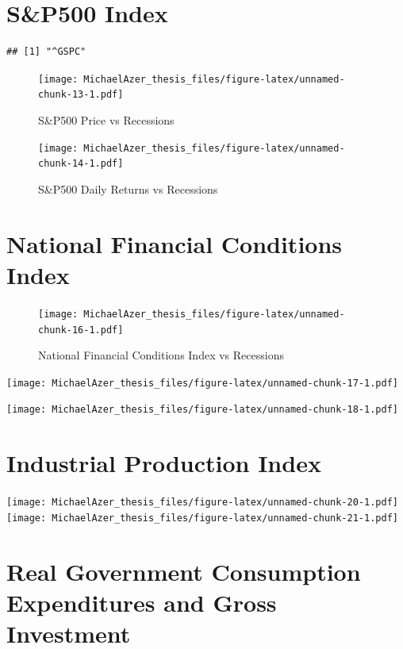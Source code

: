 \documentclass[]{book}
\begin{document}
\hypertarget{sp500-index}{%
\section{S\&P500 Index}\label{sp500-index}}

\begin{verbatim}
## [1] "^GSPC"
\end{verbatim}

\begin{figure}
\centering
\texttt{[image: MichaelAzer\_thesis\_files/figure-latex/unnamed-chunk-13-1.pdf]}
\caption{\label{fig:unnamed-chunk-13}\label{fig:figs}S\&P500 Price vs Recessions}
\end{figure}

\begin{figure}
\centering
\texttt{[image: MichaelAzer\_thesis\_files/figure-latex/unnamed-chunk-14-1.pdf]}
\caption{\label{fig:unnamed-chunk-14}\label{fig:figs}S\&P500 Daily Returns vs Recessions}
\end{figure}

\hypertarget{national-financial-conditions-index}{%
\section{National Financial Conditions Index}\label{national-financial-conditions-index}}

\begin{figure}
\centering
\texttt{[image: MichaelAzer\_thesis\_files/figure-latex/unnamed-chunk-16-1.pdf]}
\caption{\label{fig:unnamed-chunk-16}\label{fig:figs}National Financial Conditions Index vs Recessions}
\end{figure}

\texttt{[image: MichaelAzer\_thesis\_files/figure-latex/unnamed-chunk-17-1.pdf]}

\texttt{[image: MichaelAzer\_thesis\_files/figure-latex/unnamed-chunk-18-1.pdf]}

\hypertarget{industrial-production-index}{%
\section{Industrial Production Index}\label{industrial-production-index}}

\texttt{[image: MichaelAzer\_thesis\_files/figure-latex/unnamed-chunk-20-1.pdf]}
\texttt{[image: MichaelAzer\_thesis\_files/figure-latex/unnamed-chunk-21-1.pdf]}

\hypertarget{real-government-consumption-expenditures-and-gross-investment}{%
\section{Real Government Consumption Expenditures and Gross Investment}\label{real-government-consumption-expenditures-and-gross-investment}}
\end{document}

